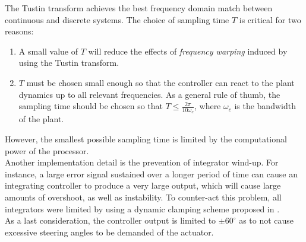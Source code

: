 The Tustin transform achieves the best frequency domain match between continuous and discrete systems. The choice of sampling time $T$ is critical for two reasons:

\begin{enumerate}
\item{A small value of $T$ will reduce the effects of \textit{frequency warping} induced by using the Tustin transform.}
\item{$T$ must be chosen small enough so that the controller can react to the plant dynamics up to all relevant frequencies. As a general rule of thumb, the sampling time should be chosen so that $T \leq \frac{2 \pi}{10 \omega_c}$, where $\omega_c$ is the bandwidth of the plant.}
\end{enumerate}

However, the smallest possible sampling time is limited by the computational power of the processor. \\

Another implementation detail is the prevention of integrator wind-up. For instance, a large error signal sustained over a longer period of time can cause an integrating controller to produce a very large output, which will cause large amounts of overshoot, as well as instability. To counter-act this problem, all integrators were limited by using a dynamic clamping scheme proposed in \cite{antiwindup}. \\

As a last consideration, the controller output is limited to $\pm 60^{\circ}$ as to not cause excessive steering angles to be demanded of the actuator.